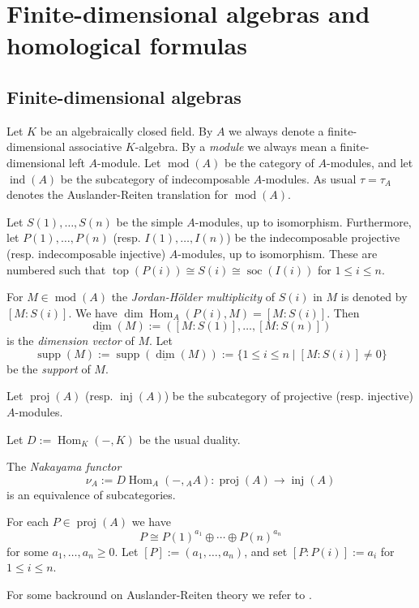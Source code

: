 \documentclass[12pt,reqno]{amsart}
\theoremstyle{definition}
\newcommand{\df}{\colon}
\newcommand{\md}{\operatorname{mod}}
\newcommand{\ind}{\operatorname{ind}}
\newcommand{\dimv}{\underline{\dim}}
\newcommand{\soc}{\operatorname{soc}}
\newcommand{\tp}{\operatorname{top}}
\newcommand{\supp}{\operatorname{supp}}
\newcommand{\proj}{\operatorname{proj}}
\newcommand{\inj}{\operatorname{inj}}
\newcommand{\Hom}{\operatorname{Hom}}
\begin{document}

\section{Finite-dimensional algebras and homological formulas}\label{sec:preliminary}


\subsection{Finite-dimensional algebras}
Let $K$ be an algebraically closed field.
By $A$ we always denote a finite-dimensional associative $K$-algebra.
By a \emph{module} we always mean a finite-dimensional left $A$-module.
Let $\md(A)$ be the category of $A$-modules,
and let $\ind(A)$ be the subcategory of indecomposable
$A$-modules.
As usual $\tau = \tau_A$ denotes the Auslander-Reiten translation
for $\md(A)$.

Let $S(1),\ldots,S(n)$ be the simple $A$-modules, up to isomorphism.
Furthermore, let $P(1),\ldots,P(n)$ (resp. $I(1),\ldots,I(n)$)
be the indecomposable projective (resp. indecomposable injective)
$A$-modules, up to isomorphism.
These are numbered such that $\tp(P(i)) \cong S(i) \cong \soc(I(i))$
for $1 \le i \le n$.

For $M \in \md(A)$ the
\emph{Jordan-H\"older multiplicity} of $S(i)$ in $M$ is denoted by
$[M:S(i)]$.
We have $\dim \Hom_A(P(i),M) = [M:S(i)]$.
Then
$$
\dimv(M) := ([M:S(1)],\ldots,[M:S(n)])
$$
is the
\emph{dimension vector} of $M$.
Let
$$
\supp(M) := \supp(\dimv(M)) :=
\{ 1 \le i \le n \mid [M:S(i)] \not= 0 \}
$$
be the
\emph{support} of $M$.

Let $\proj(A)$ (resp. $\inj(A)$) be the subcategory of projective (resp. injective) $A$-modules.

Let $D := \Hom_K(-,K)$ be the usual duality.

The \emph{Nakayama functor}
$$
\nu_A := D\Hom_A(-,{_A}A)\df \proj(A) \to \inj(A)
$$
is an equivalence of subcategories.

For each $P \in \proj(A)$ we have
$$
P \cong P(1)^{a_1} \oplus \cdots \oplus P(n)^{a_n}
$$
for some $a_1,\ldots,a_n \ge 0$.
Let $[P] := (a_1,\ldots,a_n)$, and set $[P:P(i)] := a_i$ for $1 \le i \le n$.


For some backround on Auslander-Reiten theory we refer to \cite{ARS97}.
\end{document}
